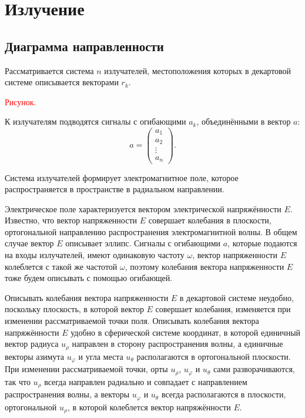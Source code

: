 \chapter{Излучение}

\section{Диаграмма направленности}

Рассматривается система $n$ излучателей, местоположения которых в декартовой системе описывается векторами $r_k$.

\textcolor{red}{Рисунок.}

К излучателям подводятся сигналы с огибающими $a_k$, объединёнными в вектор $a$:
\[
    a = \begin{pmatrix}
        a_1    \\
        a_2    \\
        \vdots \\
        a_n
    \end{pmatrix}
    .
\]

Система излучателей формирует электромагнитное поле, которое распространяется в пространстве в радиальном направлении.

Электрическое поле характеризуется вектором электрической напряжённости $E$. Известно, что вектор напряженности $E$ совершает колебания в плоскости,
ортогональной направлению распространения электромагнитной волны. В общем случае вектор $E$ описывает эллипс. Сигналы с огибающими $a$, которые подаются
на входы излучателей, имеют одинаковую частоту $\omega$, вектор напряженности $E$ колеблется с такой же частотой $\omega$, поэтому колебания вектора
напряженности $E$ тоже будем описывать с помощью огибающей.

Описывать колебания вектора напряженности $E$ в декартовой системе неудобно, поскольку плоскость, в которой вектор $E$ совершает колебания, изменяется
при изменении рассматриваемой точки поля. Описывать колебания вектора напряжённости $E$ удобно в сферической системе координат, в которой единичный
вектор радиуса $u_\rho$ направлен в сторону распространения волны, а единичные векторы азимута $u_\varphi$ и угла места $u_\theta$ располагаются
в ортогональной плоскости. При изменении рассматриваемой точки, орты $u_\rho$, $u_\varphi$ и $u_\theta$ сами разворачиваются, так что $u_\rho$
всегда направлен радиально и совпадает с направлением распространения волны, а векторы $u_\varphi$ и $u_\theta$ всегда располагаются в плоскости,
ортогональной $u_\rho$, в которой колеблется вектор напряжённости $E$.

